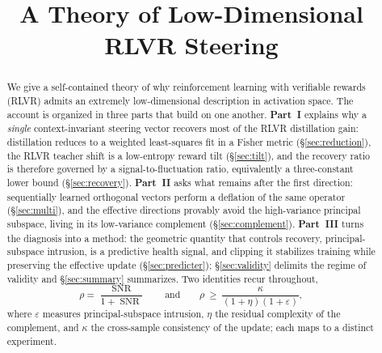 \documentclass[11pt]{article}
\title{\bfseries A Theory of Low-Dimensional RLVR Steering}
\author{}
\date{}
\DeclareMathOperator{\SNR}{SNR}
\begin{document}
\maketitle
\vspace{-3em}

\begin{abstract}
\noindent
We give a self-contained theory of why reinforcement learning with verifiable rewards (RLVR) admits
an extremely low-dimensional description in activation space. The account is organized in three
parts that build on one another. \textbf{Part~I} explains why a \emph{single}
context-invariant steering vector recovers most of the RLVR distillation gain: distillation reduces to
a weighted least-squares fit in a Fisher metric (\S\ref{sec:reduction}), the RLVR teacher shift is a
low-entropy reward tilt (\S\ref{sec:tilt}), and the recovery ratio is therefore governed by a
signal-to-fluctuation ratio, equivalently a three-constant lower bound (\S\ref{sec:recovery}).
\textbf{Part~II} asks what remains after the first direction: sequentially learned
orthogonal vectors perform a deflation of the same operator (\S\ref{sec:multi}), and the effective
directions provably avoid the high-variance principal subspace, living in its low-variance
complement (\S\ref{sec:complement}). \textbf{Part~III} turns the diagnosis into a
method: the geometric quantity that controls recovery, principal-subspace intrusion, is a predictive
health signal, and clipping it stabilizes training while preserving the effective update
(\S\ref{sec:predicter}); \S\ref{sec:validity} delimits the regime of validity and
\S\ref{sec:summary} summarizes. Two identities recur throughout,
\begin{equation*}
\rho=\frac{\SNR}{1+\SNR}
\qquad\text{and}\qquad
\rho\ \ge\ \frac{\kappa}{(1+\eta)(1+\varepsilon)},
\end{equation*}
where $\varepsilon$ measures principal-subspace intrusion, $\eta$ the residual complexity of the
complement, and $\kappa$ the cross-sample consistency of the update; each maps to a distinct
experiment.
\end{abstract}

\end{document}
